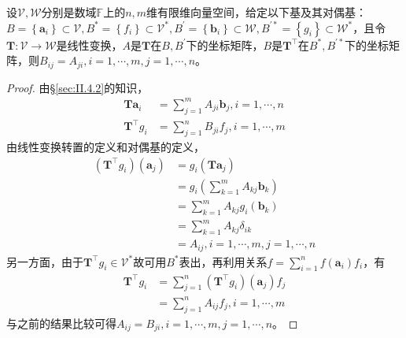 \documentclass[main.tex]{subfiles}
\begin{document}
\begin{theorem}\label{thm:II.4.17}
设$\mathcal{V},\mathcal{W}$分别是数域$\mathbb{F}$上的$n,m$维有限维向量空间，给定以下基及其对偶基：$B=\left\{\mathbf{a}_i\right\}\subset\mathcal{V},B^*=\left\{f_i\right\}\subset\mathcal{V}^*,B^\prime=\left\{\mathbf{b}_i\right\}\subset\mathcal{W},B^{\prime *}=\left\{g_i\right\}\subset\mathcal{W}^*$，且令$\mathbf{T}:\mathcal{V}\rightarrow\mathcal{W}$是线性变换，$A$是$\mathbf{T}$在$B,B^\prime$下的坐标矩阵，$B$是$\mathbf{T}^\intercal$在$B^*,B^{\prime *}$下的坐标矩阵，则$B_{ij}=A_{ji},i=1,\cdots,m,j=1,\cdots,n$。
\end{theorem}
\begin{proof}
由\S\ref{sec:II.4.2}的知识，
\begin{align*}
\mathbf{Ta}_i&=\sum_{j=1}^mA_{ji}\mathbf{b}_j,i=1,\cdots,n\\
\mathbf{T}^\intercal g_i&=\sum_{j=1}^nB_{ji}f_j,i=1,\cdots,m
\end{align*}
由线性变换转置的定义和对偶基的定义，
\begin{align*}
    \left(\mathbf{T}^\intercal g_i\right)\left(\mathbf{a}_j\right)&=g_i\left(\mathbf{Ta}_j\right)\\
    &=g_i\left(\sum_{k=1}^m A_{kj}\mathbf{b}_k\right)\\
    &=\sum_{k=1}^m A_{kj} g_i\left(\mathbf{b}_k\right)\\
    &=\sum_{k=1}^mA_{kj}\delta_{ik}\\
    &=A_{ij},i=1,\cdots,m,j=1,\cdots,n
\end{align*}
另一方面，由于$\mathbf{T}^\intercal g_i\in\mathcal{V}^*$故可用$B^*$表出，再利用关系$f=\sum_{i=1}^nf\left(\mathbf{a}_i\right)f_i$，有
\begin{align*}
    \mathbf{T}^\intercal g_i&=\sum_{j=1}^n\left(\mathbf{T}^\intercal g_i\right)\left(\mathbf{a}_j\right) f_j\\
    &=\sum_{j=1}^n A_{ij}f_j,i=1,\cdots,m
\end{align*}
与之前的结果比较可得$A_{ij}=B_{ji},i=1,\cdots,m,j=1,\cdots,n$。
\end{proof}
\end{document}
